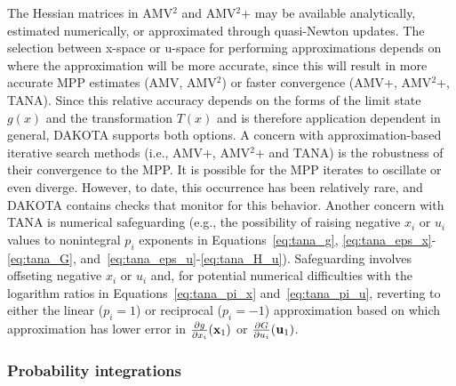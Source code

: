 The Hessian matrices in AMV$^2$ and AMV$^2$+ may be available
analytically, estimated numerically, or approximated through
quasi-Newton updates.  The selection between x-space or u-space for
performing approximations depends on where the approximation will be
more accurate, since this will result in more accurate MPP estimates
(AMV, AMV$^2$) or faster convergence (AMV+, AMV$^2$+, TANA).  Since
this relative accuracy depends on the forms of the limit state $g(x)$
and the transformation $T(x)$ and is therefore application dependent
in general, DAKOTA supports both options.  A concern with
approximation-based iterative search methods (i.e., AMV+, AMV$^2$+ and
TANA) is the robustness of their convergence to the MPP.  It is
possible for the MPP iterates to oscillate or even diverge.  However,
to date, this occurrence has been relatively rare, and DAKOTA contains
checks that monitor for this behavior.  Another concern with TANA is
numerical safeguarding (e.g., the possibility of raising negative
$x_i$ or $u_i$ values to nonintegral $p_i$ exponents in
Equations~\ref{eq:tana_g}, \ref{eq:tana_eps_x}-\ref{eq:tana_G},
and~\ref{eq:tana_eps_u}-\ref{eq:tana_H_u}).  Safeguarding involves
offseting negative $x_i$ or $u_i$ and, for potential numerical
difficulties with the logarithm ratios in Equations~\ref{eq:tana_pi_x}
and~\ref{eq:tana_pi_u}, reverting to either the linear ($p_i = 1$) or
reciprocal ($p_i = -1$) approximation based on which approximation has
lower error in $\frac{\partial g}{\partial x_i}({\bf x}_1)$ or
$\frac{\partial G}{\partial u_i}({\bf u}_1)$.

\subsubsection{Probability integrations} \label{uq:reliability:mpp:int}

